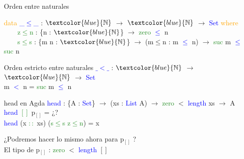 \documentclass[xcolor=dvipsnames]{beamer} %
\newcommand{\cf}[1]{\textcolor{blue}{#1}}
\newcommand{\ct}[1]{\textcolor{blue}{#1}}
\newcommand{\cc}[1]{\textcolor{ForestGreen}{#1}}
\newcommand{\ck}[1]{\textcolor{orange}{#1}}
\newcommand{\N}{\ct{\mathbb{N}}}
\newcommand{\ra}{\rightarrow}
\begin{document}
\begin{frame}

\begin{block}{Orden entre naturales}

\ck{data} \ct{\_$\leq$\_} : $\N$ $\ra$ $\N$ $\ra$ \ct{Set} \ck{where}\\
\ \ \ \ \cc{z$\leq$n} : \{n : $\N$\}                 $\ra$ \cc{zero}  \ct{$\leq$} n\\
\ \ \ \ \cc{s$\leq$s} : \{m n : $\N$\} $\ra$ (m$\leq$n : m \ct{$\leq$} n) $\ra$ \cc{suc} m \ct{$\leq$} \cc{suc} n

\end{block}

\begin{block}{Orden estricto entre naturales}
\cf{$\_<\_$} : $\N$ $\ra$ $\N$ $\ra$ \ct{Set}\\
m \cf{$<$} n = \cc{suc} m \cf{$\leq$} n
\end{block}

\begin{block}{head en Agda}
    \cf{head} : \{A : \ct{Set}\}  $\ra$ (xs : \ct{List} A) $\ra$ 
    \cc{zero} $<$ \ct{length} xs $\rightarrow$ A \\
    \cf{head} \cc{$[]$} p$_{[]}$ = ¿?\\
    \cf{head} (x \cc{$::$} xs) (\cc{s$\leq$s} \cc{z$\leq$n}) = x
  \end{block}  

\pause

\begin{block}{}
¿Podremos hacer lo mismo ahora para p$_{[]}$ ?\\ \pause
El tipo de p$_{[]}$ : \cc{zero} $<$ \ct{length} $[]$
\end{block}

\end{frame}
\end{document}

